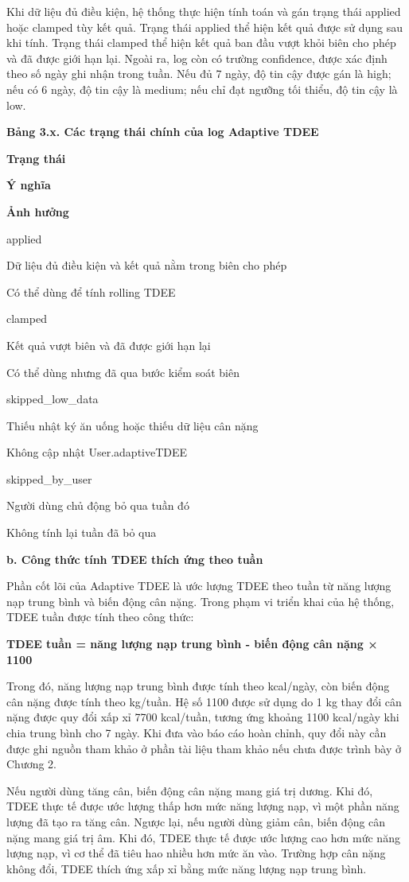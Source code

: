 \documentclass[12pt, a4paper]{report}
\begin{document}
Khi dữ liệu đủ điều kiện, hệ thống thực hiện tính toán và gán trạng thái applied hoặc clamped tùy kết quả. Trạng thái applied thể hiện kết quả được sử dụng sau khi tính. Trạng thái clamped thể hiện kết quả ban đầu vượt khỏi biên cho phép và đã được giới hạn lại. Ngoài ra, log còn có trường confidence, được xác định theo số ngày ghi nhận trong tuần. Nếu đủ 7 ngày, độ tin cậy được gán là high; nếu có 6 ngày, độ tin cậy là medium; nếu chỉ đạt ngưỡng tối thiểu, độ tin cậy là low.

\textbf{Bảng 3.x. Các trạng thái chính của log Adaptive TDEE}

\textbf{Trạng thái}

\textbf{Ý nghĩa}

\textbf{Ảnh hưởng}

applied

Dữ liệu đủ điều kiện và kết quả nằm trong biên cho phép

Có thể dùng để tính rolling TDEE

clamped

Kết quả vượt biên và đã được giới hạn lại

Có thể dùng nhưng đã qua bước kiểm soát biên

skipped\_low\_data

Thiếu nhật ký ăn uống hoặc thiếu dữ liệu cân nặng

Không cập nhật User.adaptiveTDEE

skipped\_by\_user

Người dùng chủ động bỏ qua tuần đó

Không tính lại tuần đã bỏ qua

\textbf{b. Công thức tính TDEE thích ứng theo tuần}

Phần cốt lõi của Adaptive TDEE là ước lượng TDEE theo tuần từ năng lượng nạp trung bình và biến động cân nặng. Trong phạm vi triển khai của hệ thống, TDEE tuần được tính theo công thức:

\textbf{TDEE tuần = năng lượng nạp trung bình - biến động cân nặng × 1100}

Trong đó, năng lượng nạp trung bình được tính theo kcal/ngày, còn biến động cân nặng được tính theo kg/tuần. Hệ số 1100 được sử dụng do 1 kg thay đổi cân nặng được quy đổi xấp xỉ 7700 kcal/tuần, tương ứng khoảng 1100 kcal/ngày khi chia trung bình cho 7 ngày. Khi đưa vào báo cáo hoàn chỉnh, quy đổi này cần được ghi nguồn tham khảo ở phần tài liệu tham khảo nếu chưa được trình bày ở Chương 2.

Nếu người dùng tăng cân, biến động cân nặng mang giá trị dương. Khi đó, TDEE thực tế được ước lượng thấp hơn mức năng lượng nạp, vì một phần năng lượng đã tạo ra tăng cân. Ngược lại, nếu người dùng giảm cân, biến động cân nặng mang giá trị âm. Khi đó, TDEE thực tế được ước lượng cao hơn mức năng lượng nạp, vì cơ thể đã tiêu hao nhiều hơn mức ăn vào. Trường hợp cân nặng không đổi, TDEE thích ứng xấp xỉ bằng mức năng lượng nạp trung bình.
\end{document}
